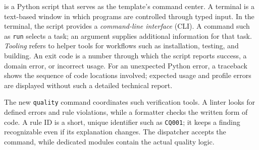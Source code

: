 \begin{beginnerstatement}

 is a Python script that serves as the template's
command center. A terminal is a text-based window in which programs are
controlled through typed input. In the terminal, the script provides a
\emph{command-line interface} (CLI). A command such as \texttt{run} selects a
task; an argument supplies additional information for that task.
\emph{Tooling} refers to helper tools for workflows such as installation,
testing, and building. An exit code is a number through which the script
reports success, a domain error, or incorrect usage. For an unexpected Python
error, a traceback shows the sequence of code locations involved;
expected usage and profile errors are displayed without such a detailed
technical report.

The new \texttt{quality} command coordinates such verification tools. A linter
looks for defined errors and rule violations, while a formatter checks the
written form of code. A rule ID is a short, unique identifier such as
\texttt{CQ001}; it keeps a finding recognizable even if its explanation
changes. The dispatcher accepts the command, while dedicated modules contain
the actual quality logic.

\end{beginnerstatement}
